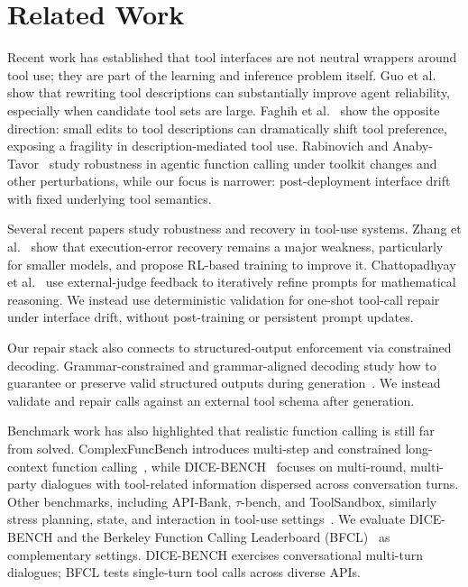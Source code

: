 \documentclass{llncs}
\begin{document}
\section{Related Work}
Recent work has established that tool interfaces are not neutral wrappers around
tool use; they are part of the learning and inference problem itself.
Guo et al.~\cite{guo2026rewrite} show that rewriting tool descriptions can
substantially improve agent reliability, especially when candidate tool sets are
large. Faghih et al.~\cite{faghih2025gaming} show the opposite direction:
small edits to tool descriptions can dramatically shift tool preference, exposing a
fragility in description-mediated tool use. Rabinovich and
Anaby-Tavor~\cite{rabinovich2025robustness} study robustness in agentic function calling under
toolkit changes and other perturbations, while our focus is narrower: post-deployment
interface drift with fixed underlying tool semantics.

Several recent papers study robustness and recovery in tool-use systems.
Zhang et al.~\cite{zhang2026fission} show that execution-error recovery remains a
major weakness, particularly for smaller models, and propose RL-based training to
improve it. Chattopadhyay et al.~\cite{chattopadhyay2025modelgrounded} use
external-judge feedback to iteratively refine prompts for mathematical reasoning.
We instead use deterministic validation for one-shot tool-call repair under
interface drift, without post-training or persistent prompt updates.

Our repair stack also connects to structured-output enforcement via constrained
decoding. Grammar-constrained and grammar-aligned decoding study how to guarantee
or preserve valid structured outputs during generation~\cite{geng2023grammar,park2024grammar}.
We instead validate and repair calls against an external tool schema after generation.

Benchmark work has also highlighted that realistic function calling is still far from
solved. ComplexFuncBench introduces multi-step and constrained long-context function
calling~\cite{zhong2025complexfuncbench}, while
DICE-BENCH~\cite{jang2025dicebench} focuses on multi-round, multi-party dialogues
with tool-related information dispersed across conversation turns. Other benchmarks,
including API-Bank,
$\tau$-bench, and ToolSandbox, similarly stress planning, state, and interaction
in tool-use settings~\cite{li2023apibank,yao2024taubench,lu2024toolsandbox}. We
evaluate DICE-BENCH and the Berkeley Function Calling Leaderboard
(BFCL)~\cite{bfcl2024} as complementary settings. DICE-BENCH exercises
conversational multi-turn dialogues; BFCL tests single-turn tool calls across diverse
APIs.
\end{document}
